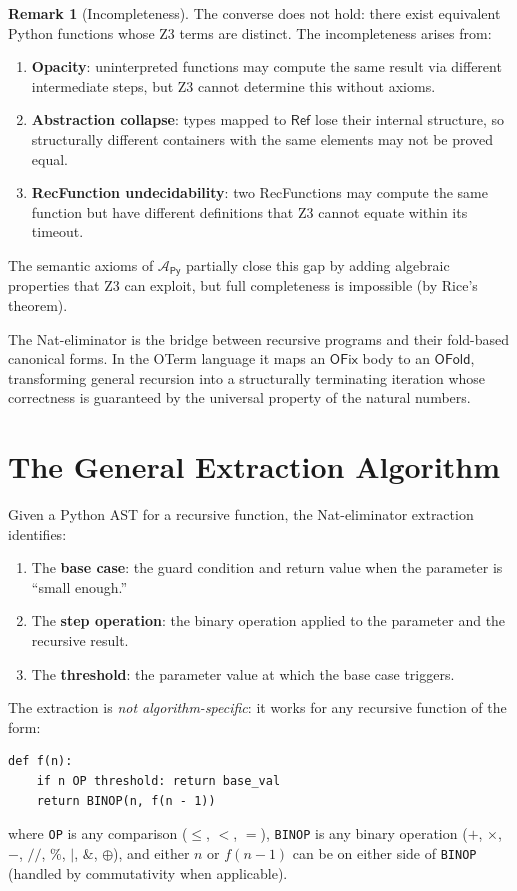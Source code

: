 \documentclass[11pt,a4paper]{report}
\theoremstyle{definition}
\newtheorem{remark}[definition]{Remark}
\theoremstyle{plain}
\begin{document}
\begin{remark}[Incompleteness]
The converse does not hold: there exist equivalent Python functions
whose Z3 terms are distinct.  The incompleteness arises from:
\begin{enumerate}
  \item \textbf{Opacity}: uninterpreted functions may compute the
    same result via different intermediate steps, but Z3 cannot
    determine this without axioms.
  \item \textbf{Abstraction collapse}: types mapped to $\mathsf{Ref}$
    lose their internal structure, so structurally different containers
    with the same elements may not be proved equal.
  \item \textbf{RecFunction undecidability}: two RecFunctions may
    compute the same function but have different definitions that
    Z3 cannot equate within its timeout.
\end{enumerate}
The semantic axioms of $\mathcal{A}_\mathsf{Py}$ partially close
this gap by adding algebraic properties that Z3 can exploit, but
full completeness is impossible (by Rice's theorem).
\end{remark}
\label{ch:nat-elim}

The Nat-eliminator is the bridge between recursive programs and their
fold-based canonical forms.  In the OTerm language it maps an
$\mathsf{OFix}$ body to an $\mathsf{OFold}$, transforming general
recursion into a structurally terminating iteration whose correctness
is guaranteed by the universal property of the natural numbers.

\section{The General Extraction Algorithm}

Given a Python AST for a recursive function, the Nat-eliminator
extraction identifies:
\begin{enumerate}
  \item The \textbf{base case}: the guard condition and return value
    when the parameter is ``small enough.''
  \item The \textbf{step operation}: the binary operation applied to
    the parameter and the recursive result.
  \item The \textbf{threshold}: the parameter value at which the
    base case triggers.
\end{enumerate}

The extraction is \emph{not algorithm-specific}: it works for any
recursive function of the form:
\begin{lstlisting}
def f(n):
    if n OP threshold: return base_val
    return BINOP(n, f(n - 1))
\end{lstlisting}
where \texttt{OP} is any comparison ($\leq$, $<$, $=$), \texttt{BINOP}
is any binary operation ($+$, $\times$, $-$, $//$, $\%$, $|$, $\&$,
$\oplus$), and either $n$ or $f(n-1)$ can be on either side of
\texttt{BINOP} (handled by commutativity when applicable).
\end{document}
